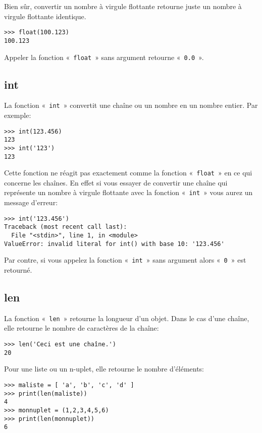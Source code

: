 Bien sûr, convertir un nombre à virgule flottante retourne juste un nombre à virgule flottante identique.
\begin{Verbatim}[frame=single,rulecolor=\color{gray}]
>>> float(100.123)
100.123
\end{Verbatim}

Appeler la fonction « \texttt{float} » sans argument retourne « \texttt{0.0} ». 

\subsection*{int}

La fonction « \texttt{int} » convertit une chaîne ou un nombre en un nombre entier. Par exemple:

\begin{Verbatim}[frame=single,rulecolor=\color{gray}]
>>> int(123.456)
123
>>> int('123')
123
\end{Verbatim}

Cette fonction ne réagit pas exactement comme la fonction « \texttt{float} » en ce qui concerne les chaînes. En effet si vous essayer de convertir une chaîne qui représente un nombre à virgule flottante avec la fonction « \texttt{int} » vous aurez un message d'erreur:
\begin{Verbatim}[frame=single,rulecolor=\color{gray}]
>>> int('123.456')
Traceback (most recent call last):
  File "<stdin>", line 1, in <module>
ValueError: invalid literal for int() with base 10: '123.456'
\end{Verbatim}

Par contre, si vous appelez la fonction « \texttt{int} »  sans argument alors « \texttt{0} » est retourné.

\subsection*{len}

La fonction « \texttt{len} » retourne la longueur d'un objet. Dans le cas d'une chaîne, elle retourne le nombre de caractères de la chaîne:
\begin{Verbatim}[frame=single,rulecolor=\color{gray}]
>>> len('Ceci est une chaîne.')
20
\end{Verbatim}

Pour une liste ou un n-uplet, elle retourne le nombre d'éléments:
\begin{Verbatim}[frame=single,rulecolor=\color{gray}]
>>> maliste = [ 'a', 'b', 'c', 'd' ]
>>> print(len(maliste))
4
>>> monnuplet = (1,2,3,4,5,6)
>>> print(len(monnuplet))
6
\end{Verbatim}

